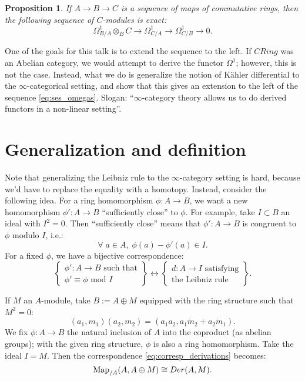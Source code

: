 \documentclass[10pt,a4paper,reqno,oneside]{book} %
\theoremstyle{plain}
\newtheorem{prop}[thm]{Proposition}
\theoremstyle{definition}
\theoremstyle{remark}
\numberwithin{equation}{section}
\begin{document}
\begin{prop}
If $A \to B \to C$ is a sequence of maps of commutative rings, then the following sequence of $C$-modules is exact:
\begin{equation}
\label{eq:ses_omegas}
	\Omega^1_{B/A} \otimes_B C \to \Omega^1_{C/A} \to \Omega^1_{C/B} \to 0.
\end{equation}
\end{prop}

One of the goals for this talk is to extend the sequence to the left. If $CRing$ was an Abelian category, we would
attempt to derive the functor $\Omega^1$; however, this is not the case. Instead, what we do is generalize the notion of
K\"ahler differential to the $\infty$-categorical setting, and show that this gives an extension to the left of the sequence
\ref{eq:ses_omegas}. Slogan: ``$\infty$-category theory allows us to do derived functors in a non-linear setting''. 



\section{Generalization and definition}
\label{sect:cc_def}

Note that generalizing the Leibniz rule to the $\infty$-category setting is hard, because we'd have to replace the 
equality with a homotopy.
Instead, consider the following idea. For a ring homomorphism $\phi : A \to B$, we want a new homomorphism $\phi': A \to B$ 
``sufficiently close'' to $\phi$. For example, take $I \subset B$ an ideal
with $I^2 = 0$. Then ``sufficiently close'' means that $\phi' : A \to B$ is congruent to $\phi$ modulo $I$, i.e.:
\[	\forall\; a \in A,\; \phi(a) - \phi'(a) \in I.	\]
For a fixed $\phi$, we have a bijective correspondence:
\begin{equation}
\label{eq:corresp_derivations}
\left\{ \begin{array} {c} \phi': A \to B \text{ such that} \\ \phi' \equiv \phi \text{ mod } I \end{array} \right\}
\longleftrightarrow
\left\{ \begin{array} {c} d: A \to I \text{ satisfying} \\ \text{the Leibniz rule} \end{array} \right\} .
\end{equation}


If $M$ an $A$-module, take $B := A \oplus M$ equipped with 
the ring structure such that $M^2 = 0$:
\[	(a_1, m_1) (a_2,m_2) = (a_1 a_2, a_1 \dot m_2 + a_2\dot m_1).	\]
We fix $\phi : A \to B$ the natural inclusion of $A$ into the coproduct (as abelian groups); with the given ring structure,
$\phi$ is also a ring homomorphism. Take the ideal $I = M$. Then the correspondence \ref{eq:corresp_derivations} becomes:
\begin{equation}
\label{eq:derivations_classical}
\operatorname{Map}_{/A}(A, A\oplus M) \cong Der(A,M).
\end{equation}
\end{document}
